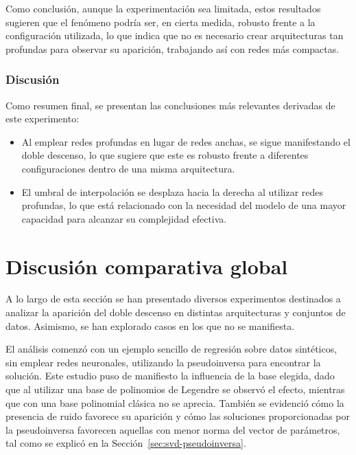 Como conclusión, aunque la experimentación sea limitada, estos resultados sugieren que el fenómeno podría ser, en cierta medida, robusto frente a la configuración utilizada, lo que indica que no es necesario crear arquitecturas tan profundas para observar su aparición, trabajando así con redes más compactas.\newline

\subsubsection{Discusión}\label{subsubsec:discusion-width-depth}

Como resumen final, se presentan las conclusiones más relevantes derivadas de este experimento:

\begin{itemize}
    \item Al emplear redes profundas en lugar de redes anchas, se sigue manifestando el doble descenso, lo que sugiere que este es robusto frente a diferentes configuraciones dentro de una misma arquitectura.
    \item El umbral de interpolación se desplaza hacia la derecha al utilizar redes profundas, lo que está relacionado con la necesidad del modelo de una mayor capacidad para alcanzar su complejidad efectiva.
\end{itemize}

\section{Discusión comparativa global}\label{sec:conclusion-informatica}

A lo largo de esta sección se han presentado diversos experimentos destinados a analizar la aparición del doble descenso en distintas arquitecturas y conjuntos de datos. Asimismo, se han explorado casos en los que no se manifiesta.\newline

El análisis comenzó con un ejemplo sencillo de regresión sobre datos sintéticos, sin emplear redes neuronales, utilizando la pseudoinversa para encontrar la solución. Este estudio puso de manifiesto la influencia de la base elegida, dado que al utilizar una base de polinomios de Legendre se observó el efecto, mientras que con una base polinomial clásica no se aprecia. También se evidenció cómo la presencia de ruido favorece su aparición y cómo las soluciones proporcionadas por la pseudoinversa favorecen aquellas con menor norma del vector de parámetros, tal como se explicó en la Sección~\ref{sec:svd-pseudoinversa}.\newline

